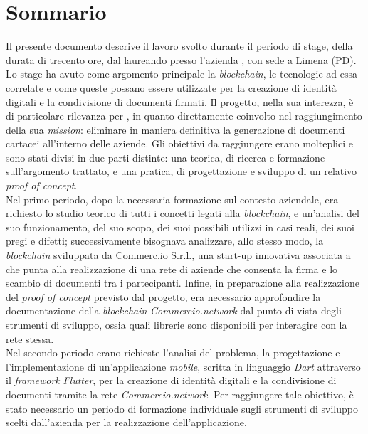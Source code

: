 
\cleardoublepage
{}
{}
\begingroup
\let\clearpage\relax
\let\cleardoublepage\relax
\let\cleardoublepage\relax

\chapter*{Sommario}

Il presente documento descrive il lavoro svolto durante il periodo di stage, della durata di trecento ore, dal laureando \myName{} presso l'azienda \myCompany{} \companyTitle{}, con sede a Limena (PD).\\
Lo stage ha avuto come argomento principale la \textit{blockchain}, le tecnologie ad essa correlate e come queste possano essere utilizzate per la creazione di identità digitali e la condivisione di documenti firmati. Il progetto, nella sua interezza, è di particolare rilevanza per \myCompany{}, in quanto direttamente coinvolto nel raggiungimento della sua \textit{mission}: eliminare in maniera definitiva la generazione di documenti cartacei all'interno delle aziende.
Gli obiettivi da raggiungere erano molteplici e sono stati divisi in due parti distinte: una teorica, di ricerca e formazione sull'argomento trattato, e una pratica, di progettazione e sviluppo di un relativo \textit{proof of concept}.\\
Nel primo periodo, dopo la necessaria formazione sul contesto aziendale, era richiesto lo studio teorico di tutti i concetti legati alla \textit{blockchain}, e un'analisi del suo funzionamento, del suo scopo, dei suoi possibili utilizzi in casi reali, dei suoi pregi e difetti; successivamente bisognava analizzare, allo stesso modo, la \textit{blockchain} sviluppata da Commerc.io S.r.l., una start-up innovativa associata a \myCompany{} \companyTitle{} che punta alla realizzazione di una rete di aziende che consenta la firma e lo scambio di documenti tra i partecipanti. Infine, in preparazione alla realizzazione del \textit{proof of concept} previsto dal progetto, era necessario approfondire la documentazione della \textit{blockchain} \textit{Commercio.network} dal punto di vista degli strumenti di sviluppo, ossia quali librerie sono disponibili per interagire con la rete stessa.\\
Nel secondo periodo erano richieste l'analisi del problema, la progettazione e l'implementazione di un'applicazione \textit{mobile}, scritta in linguaggio \textit{Dart} attraverso il \textit{framework} \textit{Flutter}, per la creazione di identità digitali e la condivisione di documenti tramite la rete \textit{Commercio.network}. Per raggiungere tale obiettivo, è stato necessario un periodo di formazione individuale sugli strumenti di sviluppo scelti dall'azienda per la realizzazione dell'applicazione.

%
%

\endgroup			

\vfill

